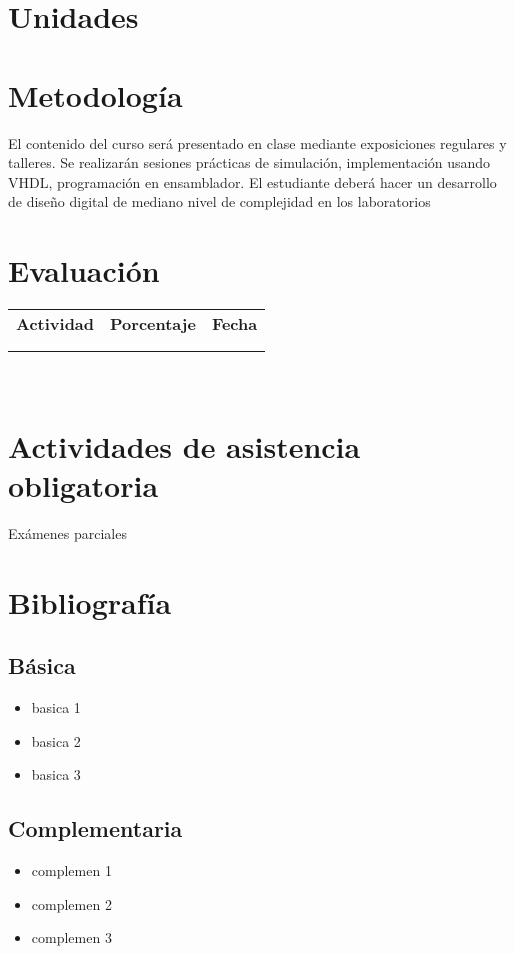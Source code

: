 \documentclass[11pt]{article}
\begin{document}
\section*{Unidades}
\noindent 


\section*{Metodología}

El contenido del curso será presentado en clase mediante exposiciones regulares y talleres. Se realizarán sesiones prácticas de simulación, implementación usando VHDL, programación en ensamblador. El estudiante deberá hacer un desarrollo de diseño digital de mediano nivel de complejidad en los laboratorios

\section*{Evaluación}
\noindent \begin{tabular}{R{0.5\textwidth} C{0.2\textwidth} C{0.2\textwidth}}
	\toprule
	\textbf{Actividad} & \textbf{Porcentaje} & \textbf{Fecha} \\
	\\
	\midrule
	
	\\
	\midrule
\end{tabular}
\\
\section*{Actividades de asistencia obligatoria}

Exámenes parciales

\section*{Bibliografía}

\subsection*{Básica}

\begin{itemize}
\item basica 1  \item  basica 2  \item  basica 3  
\end{itemize}

\subsection*{Complementaria}

\begin{itemize}
\item complemen 1  \item  complemen 2  \item  complemen 3  
\end{itemize}
\end{document}
